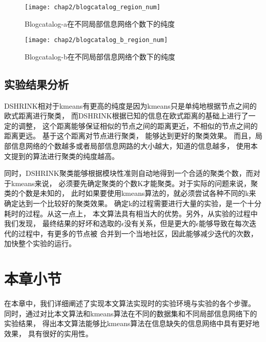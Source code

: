 \begin{figure}
    \texttt{[image: chap2/blogcatalog\_region\_num]}
    \caption{Blogcatalog-a在不同局部信息网络个数下的纯度}
    \label{fig:region_num:a}
\end{figure}

\begin{figure}
    \texttt{[image: chap2/blogcatalog\_b\_region\_num]}
    \caption{Blogcatalog-b在不同局部信息网络个数下的纯度}
    \label{fig:region_num:b}
\end{figure}

\subsection{实验结果分析}

DSHRINK相对于kmeans有更高的纯度是因为kmeans只是单纯地根据节点之间的欧式距离进行聚类，
而DSHRINK根据已知的信息在欧式距离的基础上进行了一定的调整，
这个距离能够保证相似的节点之间的距离更近，不相似的节点之间的距离更远。
基于这个距离对节点进行聚类，
能够达到更好的聚类效果。
而且，局部信息网络的个数越多或者局部信息网路的大小越大，知道的信息越多，
使用本文提到的算法进行聚类的纯度越高。

同时，DSHRINK聚类能够根据模块性准则自动地得到一个合适的聚类个数，而对于kmeans来说，
必须要先确定聚类的个数K才能聚类。对于实际的问题来说，聚类的个数是未知的，
此时如果要使用kmeans算法的，就必须尝试各种不同的k来确定达到一个比较好的聚类效果。
确定k的过程需要进行大量的实验，是一个十分耗时的过程。从这一点上，
本文算法具有相当大的优势。另外，从实验的过程中我们发现，
最终结果的好坏和选取的$\epsilon$没有关系，但是更大的$\epsilon$能够导致在每次迭代的过程中，有更多的节点被
合并到一个当地社区，因此能够减少迭代的次数，加快整个实验的运行。

\section{本章小节}

在本章中，我们详细阐述了实现本文算法实现时的实验环境与实验的各个步骤。
同时，通过对比本文算法和kmeans算法在不同的数据集和不同局部信息网络下的实验结果，
得出本文算法能够比kmeans算法在信息缺失的信息网络中具有更好地效果，
具有很好的实用性。
